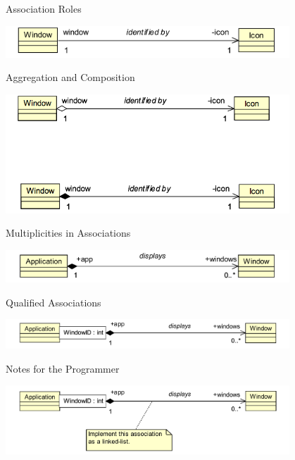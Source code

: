 \documentclass[aspectratio=1610,xcolor=dvipsnames,t,compress]{beamer}
\begin{document}
\begin{frame}{Association Roles}  
    \begin{center}
        \includegraphics[width=0.8\textwidth]{images/roles} 
    \end{center} 
\end{frame}

\begin{frame}{Aggregation and Composition} 
    \begin{center}
        \includegraphics[width=0.8\textwidth]{images/aggregation} 
    \end{center} 
\end{frame} 

\begin{frame}{Multiplicities in Associations} 
    \begin{center}
        \includegraphics[width=0.8\textwidth]{images/multiplicity} 
    \end{center} 
\end{frame} 

\begin{frame}{Qualified Associations}
    \begin{center}
        \includegraphics[width=0.8\textwidth]{images/qualified} 
    \end{center} 
\end{frame}

\begin{frame}{Notes for the Programmer} 
    \begin{center}
        \includegraphics[width=0.8\textwidth]{images/notes} 
    \end{center} 
\end{frame} 
\end{document}
